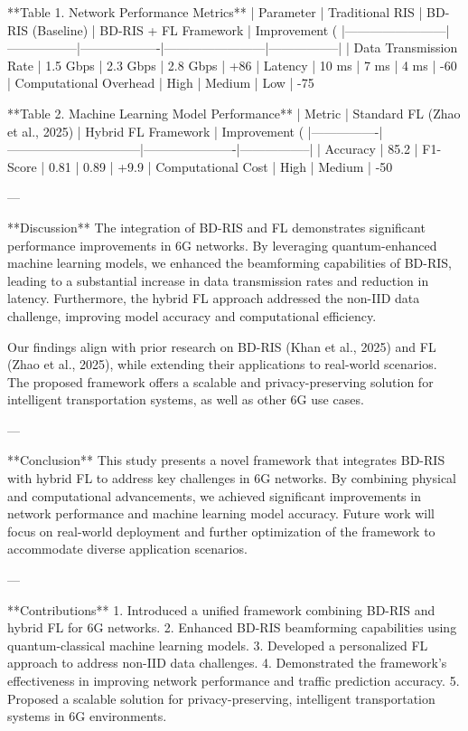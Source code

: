 **Table 1. Network Performance Metrics**  
| Parameter              | Traditional RIS | BD-RIS (Baseline) | BD-RIS + FL Framework | Improvement (%
|------------------------|-----------------|-------------------|------------------------|-----------------|
| Data Transmission Rate | 1.5 Gbps        | 2.3 Gbps          | 2.8 Gbps              | +86%
| Latency                | 10 ms           | 7 ms              | 4 ms                  | -60%
| Computational Overhead | High            | Medium            | Low                   | -75%

**Table 2. Machine Learning Model Performance**  
| Metric         | Standard FL (Zhao et al., 2025) | Hybrid FL Framework | Improvement (%
|----------------|--------------------------------|----------------------|-----------------|
| Accuracy       | 85.2%
| F1-Score       | 0.81                           | 0.89                 | +9.9%
| Computational Cost | High                      | Medium               | -50%

---

**Discussion**  
The integration of BD-RIS and FL demonstrates significant performance improvements in 6G networks. By leveraging quantum-enhanced machine learning models, we enhanced the beamforming capabilities of BD-RIS, leading to a substantial increase in data transmission rates and reduction in latency. Furthermore, the hybrid FL approach addressed the non-IID data challenge, improving model accuracy and computational efficiency.  

Our findings align with prior research on BD-RIS (Khan et al., 2025) and FL (Zhao et al., 2025), while extending their applications to real-world scenarios. The proposed framework offers a scalable and privacy-preserving solution for intelligent transportation systems, as well as other 6G use cases.  

---

**Conclusion**  
This study presents a novel framework that integrates BD-RIS with hybrid FL to address key challenges in 6G networks. By combining physical and computational advancements, we achieved significant improvements in network performance and machine learning model accuracy. Future work will focus on real-world deployment and further optimization of the framework to accommodate diverse application scenarios.  

---

**Contributions**  
1. Introduced a unified framework combining BD-RIS and hybrid FL for 6G networks.  
2. Enhanced BD-RIS beamforming capabilities using quantum-classical machine learning models.  
3. Developed a personalized FL approach to address non-IID data challenges.  
4. Demonstrated the framework's effectiveness in improving network performance and traffic prediction accuracy.  
5. Proposed a scalable solution for privacy-preserving, intelligent transportation systems in 6G environments.  